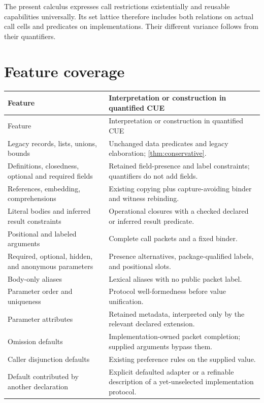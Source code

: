 \documentclass[11pt,a4paper,oneside]{report}
\theoremstyle{remark}
\begin{document}
The present calculus expresses call restrictions existentially and reusable
capabilities universally. Its set lattice therefore includes both relations
on actual call cells and predicates on implementations. Their different
variance follows from their quantifiers.

\section{Feature coverage}
\small
\begin{longtable}{@{}P{.30\textwidth}P{.64\textwidth}@{}}
\toprule
Feature & Interpretation or construction in quantified CUE\\\midrule
\endfirsthead
\toprule Feature & Interpretation or construction in quantified CUE\\\midrule
\endhead
Legacy records, lists, unions, bounds & Unchanged data predicates and legacy elaboration; \cref{thm:conservative}.\\
Definitions, closedness, optional and required fields & Retained field-presence and label constraints; quantifiers do not add fields.\\
References, embedding, comprehensions & Existing copying plus capture-avoiding binder and witness rebinding.\\
Literal bodies and inferred result constraints & Operational closures with a checked declared or inferred result predicate.\\
Positional and labeled arguments & Complete call packets and a fixed binder.\\
Required, optional, hidden, and anonymous parameters & Presence alternatives, package-qualified labels, and positional slots.\\
Body-only aliases & Lexical aliases with no public packet label.\\
Parameter order and uniqueness & Protocol well-formedness before value unification.\\
Parameter attributes & Retained metadata, interpreted only by the relevant declared extension.\\
Omission defaults & Implementation-owned packet completion; supplied arguments bypass them.\\
Caller disjunction defaults & Existing preference rules on the supplied value.\\
Default contributed by another declaration & Explicit defaulted adapter or a refinable description of a yet-unselected implementation protocol.\\

\end{longtable}
\end{document}
